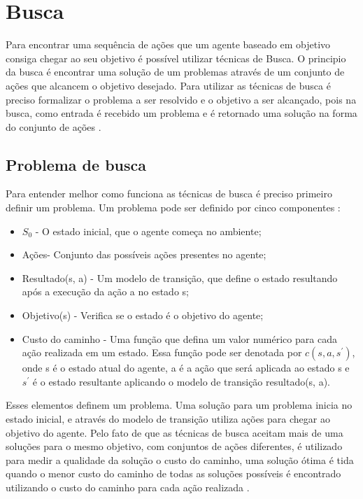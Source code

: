 \chapter{\label{chap:busca}Busca}

Para encontrar uma sequência de ações que um agente baseado em objetivo consiga chegar ao seu objetivo é possível utilizar técnicas de Busca. O principio da busca é encontrar uma solução de um problemas através de um conjunto de ações que alcancem o objetivo desejado. Para utilizar as técnicas de busca é preciso formalizar o problema a ser resolvido e o objetivo a ser alcançado, pois na busca, como entrada é recebido um problema e é retornado uma solução na forma do conjunto de ações \cite{intelligence2003modern}. 

\section{Problema de busca}

Para entender melhor como funciona as técnicas de busca é preciso primeiro definir um problema. Um problema pode ser definido por cinco componentes \cite{intelligence2003modern}:
   
\begin{itemize}
	\item $S_{0}$ - O estado inicial, que o agente começa no ambiente;
	\item Ações- Conjunto das possíveis ações presentes no agente;
	\item Resultado(s, a) - Um modelo de transição, que define o estado resultando após a execução da ação a no estado s;
	\item Objetivo(s) - Verifica se o estado é o objetivo do agente;
	\item Custo do caminho - Uma função que defina um valor numérico para cada ação realizada em um estado. Essa função pode ser denotada por $c(s, a, s^{'})$, onde s é o estado atual do agente, a é a ação que será aplicada ao estado s e $s^{'}$ é o estado resultante aplicando o modelo de transição resultado(s, a). 
\end{itemize}   

Esses elementos definem um problema. Uma solução para um problema inicia no estado inicial, e através do modelo de transição utiliza ações para chegar ao objetivo do agente. Pelo fato de que as técnicas de busca aceitam mais de uma soluções para o mesmo objetivo, com conjuntos de ações diferentes, é utilizado para medir a qualidade da solução o custo do caminho, uma solução ótima é tida quando o menor custo do caminho de todas as soluções possíveis é encontrado utilizando o custo do caminho para cada ação realizada \cite{intelligence2003modern}.

